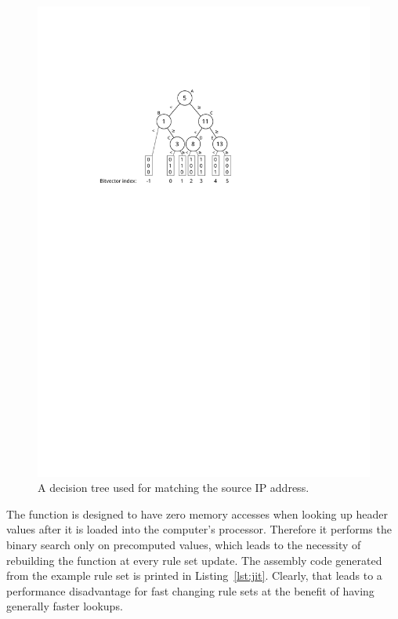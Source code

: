 \documentclass[a4paper,
		12pt,
		parskip=full,
		titlepage
		]{scrartcl}
\begin{document}
\begin{figure}
\centering
\includegraphics[height=0.35\textheight]{images/bv-tree}
\caption{A decision tree used for matching the source IP address.}
\label{fig:bv-tree}
\end{figure}

The function is designed to have zero memory accesses when looking up header 
values after it is loaded into the computer's processor.
Therefore it performs the binary search only on precomputed values, which 
leads to the necessity of rebuilding the function at every rule set update.
The assembly code generated from the example rule set is printed in Listing~\ref{lst:jit}.
Clearly, that leads to a performance disadvantage for fast changing rule sets at the benefit of having generally faster lookups.
\end{document}

